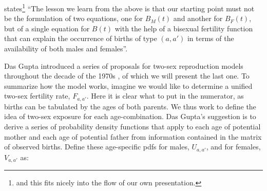 \FloatBarrier
\citet{gupta1978alternative} states\footnote{and this fits nicely into the flow
of our own presentation.} ``The lesson we learn from the above is that our
starting point must not be the formulation of two equations, one for $B_M(t)$ and another for
$B_F(t)$, but of a single equation for $B(t)$ with the help of a bisexual
fertility function that can explain the occurrence of births of type $(a,a')$ in
terms of the availability of both males and females''.

Das Gupta introduced a series of proposals for two-sex reproduction models
throughout the decade of the 1970s \citep{gupta1972two, gupta1973us,
gupta1976interactive, gupta1978alternative}, of which we will present the last
one. To summarize how the model works, imagine we would like to determine a
unified two-sex fertility rate, $F_{a,a'}$. Here it is clear
what to put in the numerator, as births can be tabulated by the ages of both parents.
 We thus work to define the idea of two-sex exposure for each age-combination. Das Gupta's
suggestion is to derive a series of probability density functions that apply to
each age of potential mother and each age of potential father from information
contained in the matrix of observed births. Define these age-specific pdfs for
males, $U_{a,a'}$, and for females, $V_{a,a'}$ as:

